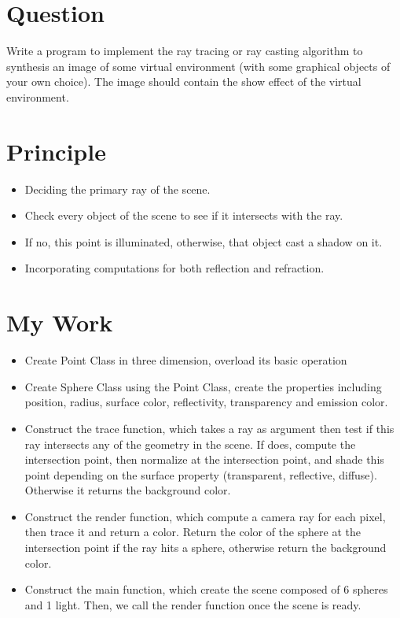 \documentclass{article}
\begin{document}
 
\maketitle{}
\section{Question}
Write a program to implement the ray tracing or ray casting algorithm to synthesis an image of some virtual environment (with some graphical objects of your own choice). The image should contain the show effect of the virtual environment.

\section{Principle}
\begin{itemize}
\item Deciding the primary ray of the scene.
\item Check every object of the scene to see if it intersects with the ray.
\item If no, this point is illuminated, otherwise, that object cast a shadow on it.
\item Incorporating computations for both reflection and  refraction.
\end{itemize}

\section{My Work}
\begin{itemize}
\item Create Point Class in three dimension, overload its basic operation
\item Create Sphere Class using the Point Class, create the properties including position, radius, surface color, reflectivity, transparency and emission color.
\item Construct the trace function, which takes a ray as argument then test if this ray intersects any of the geometry in the scene. If does, compute the intersection point, then normalize at the intersection point, and shade this point depending on the surface property (transparent, reflective, diffuse). Otherwise it returns
the background color.
\item Construct the render function, which compute a camera ray for each pixel, then trace it and return a color. Return the color of the sphere at the intersection point if the ray hits a sphere, otherwise return the background color.
\item Construct the main function, which create the scene composed of 6 spheres and 1 light. Then, we call the render function once the scene is ready.

\end{itemize}
\end{document}
